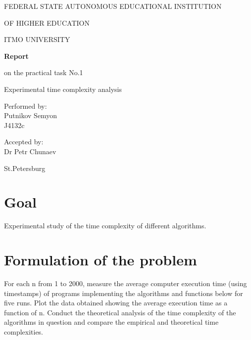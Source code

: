 \documentclass[a4paper,article,14pt]{extarticle}
\begin{document}
	\begin{titlepage}
		\begin{center}
			FEDERAL STATE AUTONOMOUS EDUCATIONAL INSTITUTION
			
			OF HIGHER EDUCATION
			
			ITMO UNIVERSITY
			\vspace{3cm}
			
			\large\textbf{Report}
			
			\large on the practical task No.1
			
			\large \flqq Experimental time complexity analysis\frqq
			\vspace{5cm}
			
			
			\begin{flushright}
				{Performed by:} \\
				Putnikov Semyon \\ 
				J4132c \\
			\end{flushright}
			
			
			\begin{flushright}
				{Accepted by:} \\
				Dr Petr Chunaev \\ 
			\end{flushright}
			\vfill
			
			{St.Petersburg}
			\par{\number\year}
		\end{center}
	\end{titlepage}
	
	\newpage
	
	\section{Goal}
	Experimental study of the time complexity of different algorithms.
	
	\section{Formulation of the problem}
	
	For each n from 1 to 2000, measure the average computer execution time (using timestamps) of programs implementing the algorithms and functions below for five runs. Plot the data obtained showing the average execution time as a function of n. Conduct the theoretical analysis of the time complexity of the algorithms in question and compare the empirical and theoretical time complexities.
	
\end{document}
